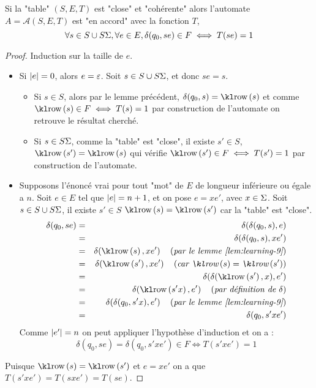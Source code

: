 \begin{lemma}
	Si la "table" $(S,E,T)$ est "close" et "cohérente" alors l'automate $A = \mathcal A (S,E,T)$
	est "en accord" avec la fonction $T$, \ie
	$$\forall s \in S \cup S\Sigma, \forall e \in E, \delta(q_0,se) \in F \iff T(se) =1$$
\end{lemma}

\begin{proof}
	Induction sur la taille de $e$.

	\begin{itemize}
		\item Si $|e| = 0$, alors $e = \varepsilon$.
		      Soit $s \in S \cup S \Sigma$, et donc $se = s$.
		      \begin{itemize}
			      \item Si $s \in S$, alors par le lemme précédent,
			            $\delta(q_0, s) = \row {s}$ et
			            comme $\row {s} \in F \iff T(s) = 1$ par construction de l'automate on retrouve le résultat cherché.
			      \item Si $s \in S\Sigma$, comme la "table" est "close", il existe $s' \in S$, \tq $\row {s'} = \row s$ qui vérifie
			            $\row {s'} \in F \iff T(s') = 1$ par construction de l'automate.

		      \end{itemize}
		\item Supposons l'énoncé vrai pour tout "mot" de $E$ de longueur inférieure ou égale a $n$. Soit $e \in E$ tel que $|e| = n + 1$,
		      et on pose $e = x e'$, avec $x \in \Sigma$. Soit $s \in S \cup S\Sigma$, il existe
		      $s' \in S$ \tq $\row s = \row {s'}$ car la "table" est "close".
		      \begin{eqnarray*}
			      \delta(q_0, se) &=& \delta(\delta(q_0,s),e) \\
			      &=& \delta(\delta(q_0,s),xe') \\
			      &=& \delta(\row s,xe') \reason{par le lemme \ref{lem:learning-9}} \\
			      &=& \delta(\row {s'},xe') \reason{car $\row s = \row {s'}$} \\
			      &=& \delta(\delta (\row {s'}, x), e') \\
			      &=& \delta(\row {s'x}, e') \reason {par définition de $\delta$}\\
			      &=& \delta(\delta(q_0, s'x), e') \reason{par le lemme \ref{lem:learning-9}} \\
			      &=& \delta(q_0, s'x e')
		      \end{eqnarray*}
		      Comme $|e'| = n$ on peut appliquer l'hypothèse d'induction et on a :
		      $$ \delta(q_0, se) = \delta(q_0, s'x e') \in F \iff T(s'x e') = 1$$

	\end{itemize}
	Puisque $\row s = \row {s'}$  et $e = xe'$ on a que $T(s'xe') = T(sxe') = T(se)$.
\end{proof}

